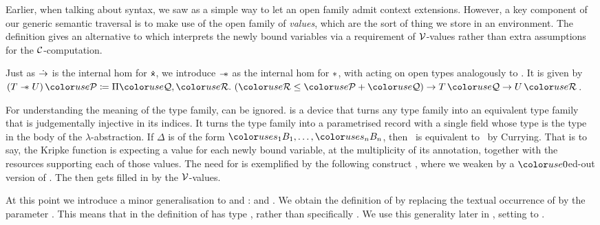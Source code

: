Earlier, when talking about syntax, we saw  as a simple way
to let an open family admit context extensions.
However, a key component of our generic semantic traversal is to make use of
the open family \AgdaBound{$\V$} of \emph{values}, which are the sort of thing
we store in an environment.
The definition  gives an alternative to
 which interprets the newly bound variables via a
requirement of $\V$-values rather than extra assumptions for the
$\mathcal C$-computation.


Just as $\mathrel{\dot\to}$ is the internal hom for $\dottimes$, we introduce $\mathrel{\mathord{-}\hspace{-0.75ex}*}$ as
the internal hom for $\mathbin{*}$, with  acting on open types
analogously to .
It is given by $\plr{T \wand U}\,\grP \coloneqq
\Pi\grQ,\grR.~\plr{\grR \leq \grP + \grQ} \to T\,\grQ \to U\,\grR$.

For understanding the meaning of the type family,  can be
ignored.
 is a device that turns any type family into an equivalent
type family that is judgementally injective in its indices.
It turns the type family into a parametrised record with a single field
 whose type is the type in the body of the $\lambda$-abstraction.
If $\Delta$ is of the form $\gr{s_1}B_1, \ldots, \gr{s_n}B_n$, then
\ is equivalent to
\ by Currying.
That is to say, the Kripke function is expecting a value for each newly bound
variable, at the multiplicity of its annotation, together with the resources
supporting each of those values.
The need for  is exemplified by the following construct
, where we weaken \AgdaBound{$\Gamma$} by a $\gr0$ed-out
version of \AgdaBound{$\Delta$}.
The \AgdaBound{$\Delta$} then gets filled in by the $\V$-values.

At this point we introduce a minor generalisation to 
and :
\AgdaSpace{} and
\AgdaSpace{}.
We obtain the definition of \AgdaSpace{}
by replacing the textual occurrence of  by the parameter
.
This means that  in the definition of  has
type , rather than specifically .
We use this generality later in , setting 
to .

